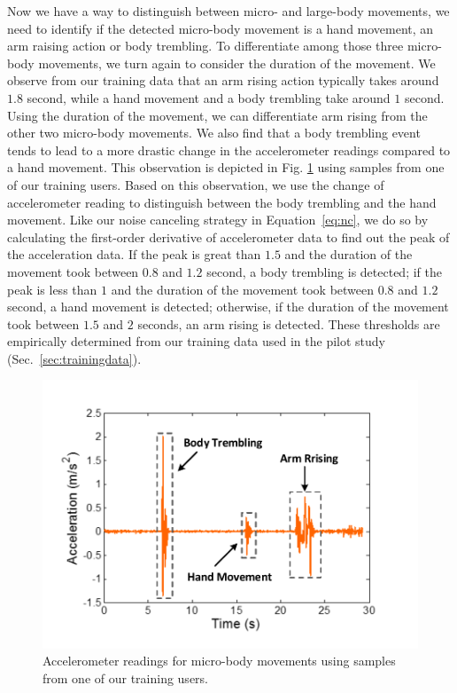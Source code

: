  Now we have a way to distinguish between micro- and large-body movements, we need
to identify if the detected micro-body movement is a hand movement, an arm raising action or body trembling. To differentiate among those
three micro-body movements, we turn again to consider the duration of the movement. We observe from our training data that an arm rising
action typically takes around $1.8$ second, while a hand movement and a body trembling take around $1$ second. Using the duration of the
movement, we can differentiate arm rising from the other two micro-body movements. We also find that a body trembling event tends to lead
to a more drastic change in the accelerometer readings compared to a hand movement. This observation is depicted in Fig.
\ref{fig:micro-move} using samples from one of our training users. Based on this observation, we use the change of accelerometer reading to
distinguish between the body trembling and the hand movement. Like our noise canceling strategy in Equation~\ref{eq:nc}, we  do so by
calculating the first-order derivative of accelerometer data to find out the peak of the acceleration data.  If the peak is great than
$1.5$ and the duration of the movement took between $0.8$ and $1.2$ second, a body trembling is detected; if the peak is less than $1$ and
the duration of the movement took between $0.8$ and $1.2$ second, a hand movement is detected; otherwise, if the duration of the movement
took between $1.5$ and $2$ seconds, an arm rising is detected. These thresholds are empirically determined from our training data used in
the pilot study (Sec.~\ref{sec:trainingdata}).


\begin{figure}[!t]
\centering
      \includegraphics[width=0.43\linewidth]{Figures/Micromovement.pdf}
  \caption{Accelerometer readings for micro-body movements using samples from one of our training users.}\label{fig:micro-move}
\end{figure}



